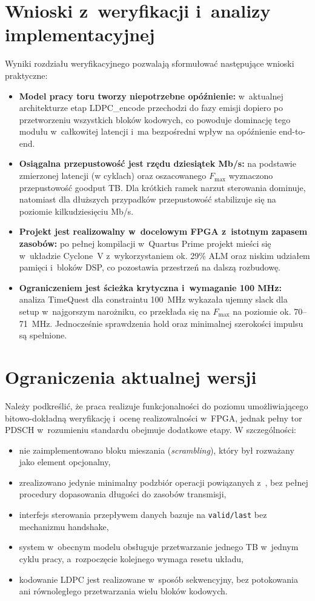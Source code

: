 \section*{Wnioski z~weryfikacji i~analizy implementacyjnej}
Wyniki rozdziału weryfikacyjnego pozwalają sformułować następujące wnioski praktyczne:

\begin{itemize}
  \item \textbf{Model pracy toru tworzy niepotrzebne opóźnienie:} w~aktualnej architekturze etap LDPC\_encode przechodzi do fazy emisji dopiero po przetworzeniu wszystkich bloków kodowych, co powoduje dominację tego modułu w~całkowitej latencji i~ma bezpośredni wpływ na opóźnienie end-to-end. 

  \item \textbf{Osiągalna przepustowość jest rzędu dziesiątek Mb/s:} na podstawie zmierzonej latencji (w cyklach) oraz oszacowanego $F_{\max}$ wyznaczono przepustowość goodput TB. Dla krótkich ramek narzut sterowania dominuje, natomiast dla dłuższych przypadków przepustowość stabilizuje się na poziomie kilkudziesięciu Mb/s. 
  \item \textbf{Projekt jest realizowalny w~docelowym FPGA z~istotnym zapasem zasobów:}
  po pełnej kompilacji w~Quartus Prime projekt mieści się w~układzie Cyclone~V z~wykorzystaniem ok. 29\% ALM oraz niskim udziałem pamięci i~bloków DSP, co pozostawia przestrzeń na dalszą rozbudowę. 

  \item \textbf{Ograniczeniem jest ścieżka krytyczna i~wymaganie 100 MHz:}
  analiza TimeQuest dla constraintu 100~MHz wykazała ujemny slack dla setup w~najgorszym narożniku, co przekłada się na $F_{\max}$ na poziomie ok. 70--71~MHz.
  Jednocześnie sprawdzenia hold oraz minimalnej szerokości impulsu są spełnione. 
\end{itemize}

\section*{Ograniczenia aktualnej wersji}
Należy podkreślić, że praca realizuje funkcjonalności do poziomu umożliwiającego bitowo-dokładną weryfikację i~ocenę realizowalności w~FPGA, jednak pełny tor PDSCH w~rozumieniu standardu obejmuje dodatkowe etapy. W szczególności:
\begin{itemize}
  \item nie zaimplementowano bloku mieszania (\textit{scrambling}), który był rozważany jako element opcjonalny,
  \item zrealizowano jedynie minimalny podzbiór operacji powiązanych z~, bez pełnej procedury dopasowania długości do zasobów transmisji,
  \item interfejs sterowania przepływem danych bazuje na \texttt{valid/last} bez mechanizmu handshake,
  \item system w~obecnym modelu obsługuje przetwarzanie jednego TB w~jednym cyklu pracy, a~rozpoczęcie kolejnego wymaga resetu układu,
  \item kodowanie LDPC jest realizowane w~sposób sekwencyjny, bez potokowania ani równoległego przetwarzania wielu bloków kodowych. 
\end{itemize}

